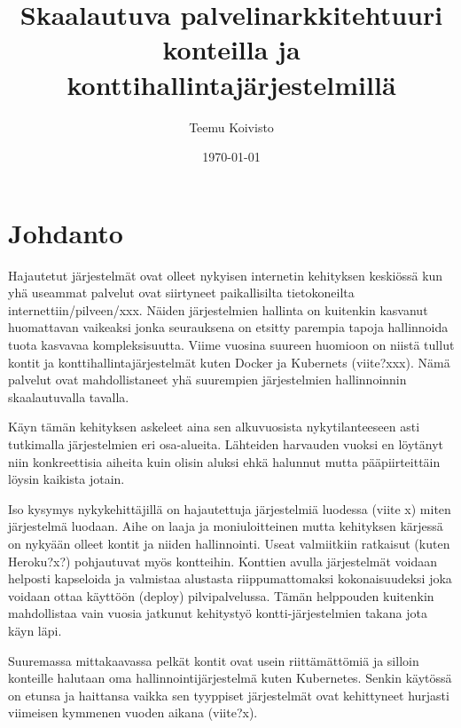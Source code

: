 \documentclass[finnish]{tktltiki2}
\title{Skaalautuva palvelinarkkitehtuuri konteilla ja konttihallintajärjestelmillä}
\author{Teemu Koivisto}
\date{\today}
\theoremstyle{definition}
\theoremstyle{remark}
\begin{document}

\frontmatter      %

\maketitle        %
\makeabstract     %

\tableofcontents  %


\mainmatter       %

\section{Johdanto}

Hajautetut järjestelmät ovat olleet nykyisen internetin kehityksen keskiössä kun yhä useammat palvelut ovat siirtyneet paikallisilta tietokoneilta internettiin/pilveen/xxx. Näiden järjestelmien hallinta on kuitenkin kasvanut huomattavan vaikeaksi jonka seurauksena on etsitty parempia tapoja hallinnoida tuota kasvavaa kompleksisuutta. Viime vuosina suureen huomioon on niistä tullut kontit ja konttihallintajärjestelmät kuten Docker ja Kubernets (viite?xxx). Nämä palvelut ovat mahdollistaneet yhä suurempien järjestelmien hallinnoinnin skaalautuvalla tavalla.

Käyn tämän kehityksen askeleet aina sen alkuvuosista nykytilanteeseen asti tutkimalla järjestelmien eri osa-alueita. Lähteiden harvauden vuoksi en löytänyt niin konkreettisia aiheita kuin olisin aluksi ehkä halunnut mutta pääpiirteittäin löysin kaikista jotain.

Iso kysymys nykykehittäjillä on hajautettuja järjestelmiä luodessa (viite x) miten järjestelmä luodaan. Aihe on laaja ja moniuloitteinen mutta kehityksen kärjessä on nykyään olleet kontit ja niiden hallinnointi. Useat valmiitkiin ratkaisut (kuten Heroku?x?) pohjautuvat myös kontteihin. Konttien avulla järjestelmät voidaan helposti kapseloida ja valmistaa alustasta riippumattomaksi kokonaisuudeksi joka voidaan ottaa käyttöön (deploy) pilvipalvelussa. Tämän helppouden kuitenkin mahdollistaa vain vuosia jatkunut kehitystyö kontti-järjestelmien takana jota käyn läpi.

Suuremassa mittakaavassa pelkät kontit ovat usein riittämättömiä ja silloin konteille halutaan oma hallinnointijärjestelmä kuten Kubernetes. Senkin käytössä on etunsa ja haittansa vaikka sen tyyppiset järjestelmät ovat kehittyneet hurjasti viimeisen kymmenen vuoden aikana (viite?x). 
\end{document}
